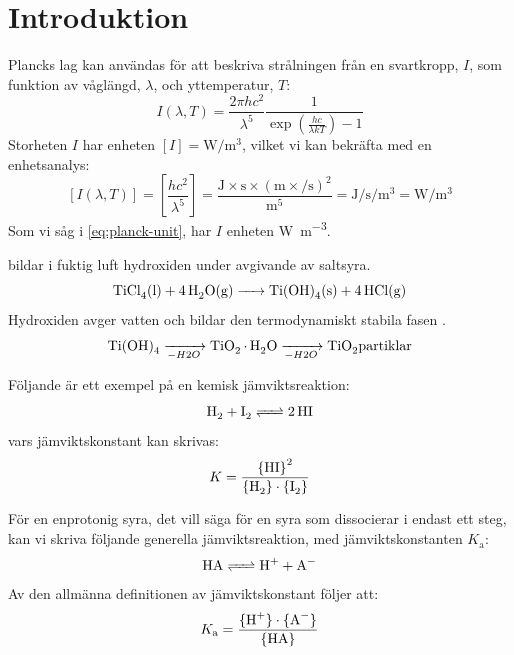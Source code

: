 \documentclass[a4paper,12pt]{article}
\begin{document}
\section{Introduktion}
Plancks lag kan användas för att beskriva strålningen från en svartkropp, $I$, som funktion av våglängd, $\lambda$, och yttemperatur, $T$:
\begin{equation}
\label{eq:planck}
I\left(\lambda, T\right) = \frac{2{\pi}hc^2}{\lambda^5}%
   \frac{1}{\exp\left(\displaystyle\frac{hc}{{\lambda}kT}\right) - 1}
\end{equation}
Storheten $I$ har enheten $[I]=\si{\watt\per\cubic\metre}$, vilket vi kan bekräfta med en enhetsanalys:
\begin{equation}
\label{eq:planck-unit}
\left[I(\lambda, T)\right] = \left[\frac{hc^2}{\lambda^5}\right] =%
   \frac{\si{\joule}\times\si{\second}\times\left(\si{\metre}\times\si{\per\second}\right)^2}{\si{\metre}^5} =%
   \si{\joule\per\second\per\cubic\metre} =%
   \si{\watt\per\cubic\metre}
\end{equation}
Som vi såg i \cref{eq:planck-unit}, har $I$ enheten \si{\watt\per\cubic\metre}.

 bildar i fuktig luft hydroxiden  under avgivande av saltsyra.
\begin{equation}
\ce{TiCl4(l) + 4H2O(g) -> Ti(OH)4(s) + 4HCl(g)}
\end{equation}
Hydroxiden avger vatten och bildar den termodynamiskt stabila fasen .
\begin{equation}
\ce{Ti(OH)4 ->[][-H2O] TiO2.H2O ->[][-H2O] TiO2 \text{partiklar}}
\end{equation}

Följande är ett exempel på en kemisk jämviktsreaktion:
\begin{equation}
\ce{H2 + I2  <=> 2HI}
\end{equation}
vars jämviktskonstant kan skrivas:
\begin{equation}
K = \frac{\ce{\{HI\}}^2}{\ce{\{H2\}}\cdot\ce{\{I2\}}}
\end{equation}

För en enprotonig syra, det vill säga för en syra  som dissocierar i endast ett steg, kan vi skriva följande generella jämviktsreaktion, med jämviktskonstanten $K_\mathrm{a}$:
\begin{equation}
\ce{HA <=> H+ + A-}
\end{equation}
Av den allmänna definitionen av jämviktskonstant följer att:
\begin{equation}
K_\mathrm{a} = \frac{{\{\ce{H+}\}\cdot\{\ce{A-}\}}}{{\{\ce{HA}\}}}
\end{equation}
\end{document}
